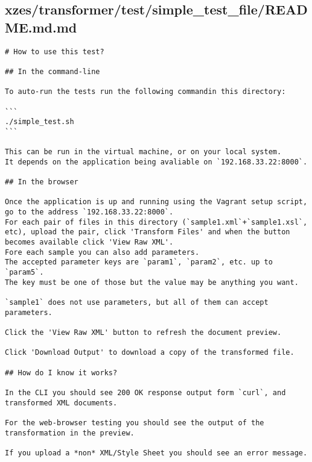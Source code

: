 \subsection{xzes/transformer/test/simple\_test\_file/README.md.md}
\begin{lstlisting}
# How to use this test?

## In the command-line

To auto-run the tests run the following commandin this directory:

```
./simple_test.sh
```

This can be run in the virtual machine, or on your local system.
It depends on the application being avaliable on `192.168.33.22:8000`.

## In the browser

Once the application is up and running using the Vagrant setup script, go to the address `192.168.33.22:8000`.
For each pair of files in this directory (`sample1.xml`+`sample1.xsl`, etc), upload the pair, click 'Transform Files' and when the button becomes available click 'View Raw XML'.
Fore each sample you can also add parameters.
The accepted parameter keys are `param1`, `param2`, etc. up to `param5`.
The key must be one of those but the value may be anything you want.

`sample1` does not use parameters, but all of them can accept parameters.

Click the 'View Raw XML' button to refresh the document preview.

Click 'Download Output' to download a copy of the transformed file.

## How do I know it works?

In the CLI you should see 200 OK response output form `curl`, and transformed XML documents.

For the web-browser testing you should see the output of the transformation in the preview.

If you upload a *non* XML/Style Sheet you should see an error message.
\end{lstlisting}
